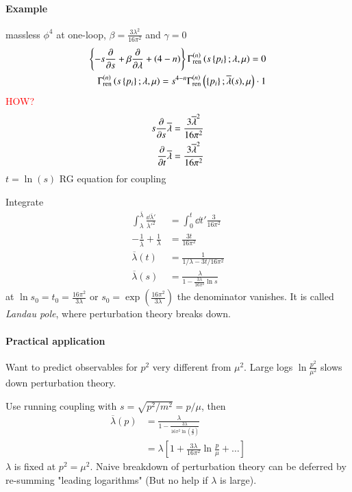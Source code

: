 \paragraph{Example} massless $\phi^4$ at one-loop, $\beta = \frac{3\lambda^2}{16 \pi^2}$ and $\gamma=0$
\begin{align*}
   \left\{ -s \pdv{s} + \beta \pdv{\lambda} + (4-n) \right\} \Gamma_\text{ren}^{(n)} \left( s \left\{ p_i \right\}; \lambda, \mu \right) = 0\\
   \Gamma_\text{ren}^{(n)} \left(  s \left\{ p_i \right\}; \lambda, \mu \right) = s^{4-n} \Gamma_\text{ren}^{(n)} \left( \left\{ p_i \right\}; \overline{\lambda}(s), \mu \right) \cdot 1
\end{align*}
\textcolor{red}{HOW?}
\begin{align*}
   s \pdv{s} \overline{\lambda} = \frac{3 \overline{\lambda}^2}{ 16 \pi^2 }\\
   \pdv{t} \overline{\lambda} = \frac{3 \overline{\lambda}^2}{16 \pi^2}
\end{align*}
$t = \ln(s)$ RG equation for coupling

Integrate 
\begin{align*}
   \int_{\lambda}^{\overline{\lambda}} \frac{\dd{\overline{\lambda}'}}{\overline{\lambda}'^2} &= \int_0^t \dd{t'} \frac{3}{16 \pi^2} \\
   - \frac{1}{\overline{\lambda}} + \frac{1}{\lambda} &= \frac{3t}{16 \pi^2} \\
   \overline{\lambda}(t) &= \frac{1}{1/\lambda - 3t / 16\pi^2} \\
   \overline{\lambda}(s) &= \frac{\lambda}{1-\frac{3\lambda}{16\pi^2} \ln s}
\end{align*}
at $\ln s_0 = t_0 = \frac{16\pi^2}{3\lambda}$ or $s_0 = \exp(\frac{16\pi^2}{3\lambda})$ the denominator vanishes. It is called \textit{Landau pole}, where perturbation theory breaks down.

\paragraph{Practical application}
Want to predict observables for $p^2$ very different from $\mu^2$. Large logs $\ln \frac{p^2}{\mu^2}$ slows down perturbation theory.

Use running coupling with $s = \sqrt{p^2 / m^2} = p / \mu$, then
\begin{align*}
   \overline{\lambda}(p) &= \frac{\lambda}{1 - \frac{3\lambda}{16\pi^2 \ln(\frac{p}{\mu})}} \\
                         &= \lambda \left[ 1 + \frac{3\lambda}{16 \pi^2} \ln \frac{p}{\mu} + \dots \right]
\end{align*}
$\lambda$ is fixed at $p^2 = \mu^2$. Naive breakdown of perturbation theory can be deferred by re-summing "leading logarithms" (But no help if $\lambda$ is large).


